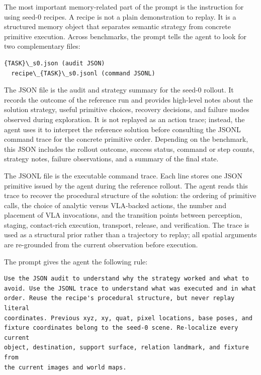 \documentclass{article}
\begin{document}
The most important memory-related part of the prompt is the instruction for using
seed-0 recipes. A recipe is not a plain demonstration to replay. It is a structured
memory object that separates semantic strategy from concrete primitive execution.
Across benchmarks, the prompt tells the agent to look for two complementary files:
\begin{lstlisting}[frame=single,framerule=0.5pt]
  {TASK}\_s0.json (audit JSON)
  recipe\_{TASK}\_s0.jsonl (command JSONL)
  \end{lstlisting}

The JSON file is the audit and strategy summary for the seed-0 rollout. It records the outcome of the reference run and provides high-level notes about the solution strategy, useful primitive choices, recovery decisions, and failure modes observed during exploration. It is not replayed as an action trace; instead, the agent uses it to interpret the reference solution before consulting the JSONL command trace for the concrete primitive order. Depending on the benchmark, this JSON includes the rollout outcome,  success status, command or step counts, strategy notes, failure observations, and a summary of the final state.

The JSONL file is the executable command trace. Each line stores one JSON primitive
  issued by the agent during the reference rollout. The agent reads this trace to recover
  the procedural structure of the solution: the ordering of primitive calls, the choice
  of analytic versus VLA-backed actions, the number and placement of VLA invocations,
  and the transition points between perception, staging, contact-rich execution,
  transport, release, and verification. The trace is used as a structural prior rather
  than a trajectory to replay; all spatial arguments are re-grounded from the current
  observation before execution.

The prompt gives the agent the following rule:

\begin{samepage}
\begin{lstlisting}[frame=single,framerule=0.5pt]
Use the JSON audit to understand why the strategy worked and what to
avoid. Use the JSONL trace to understand what was executed and in what
order. Reuse the recipe's procedural structure, but never replay literal
coordinates. Previous xyz, xy, quat, pixel locations, base poses, and
fixture coordinates belong to the seed-0 scene. Re-localize every current
object, destination, support surface, relation landmark, and fixture from
the current images and world maps.
\end{lstlisting}
\end{samepage}
\end{document}
